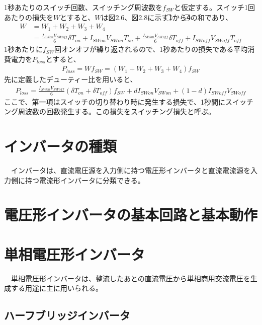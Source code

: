 \documentclass{article}
\begin{document}
1秒あたりのスイッチ回数、スイッチング周波数を\(f_{SW}\)と仮定する。スイッチ1回あたりの損失を\(W\)とすると、\(W\)は図2.6、図2.8に示す\textcircled{\scriptsize 1}から\textcircled{\scriptsize 4}の和であり、
\begin{align}
    W &= W_1 + W_2 + W_3 + W_4 \\
      &= \frac{I_{SWon}V_{SWoff}}{6}\delta T_{on} + I_{SWon}V_{SWon}T_{on} + \frac{I_{SWon}V_{SWoff}}{6}\delta T_{off} + I_{SWoff}V_{SWoff}T_{off}
\end{align}
1秒あたりに\(f_{SW}\)回オンオフが繰り返されるので、1秒あたりの損失である平均消費電力を\(P_{loss}\)とすると、
\begin{align}
    P_{loss} = Wf_{SW}=(W_1 + W_2 + W_3 + W_4)f_{SW}
\end{align}
先に定義したデューティー比を用いると、
\begin{align}
    P_{loss} = \frac{I_{SWon}V_{SWoff}}{6}(\delta T_{on} + \delta T_{off})f_{SW} + dI_{SWon}V_{SWon} + (1-d)I_{SWoff}V_{SWoff}
\end{align}
ここで、第一項はスイッチの切り替わり時に発生する損失で、1秒間にスイッチング周波数の回数発生する。この損失をスイッチング損失と呼ぶ。

\setcounter{section}{0}
\renewcommand{\thesection}{4.\arabic{section}}

\section{インバータの種類}
　インバータは、直流電圧源を入力側に持つ電圧形インバータと直流電流源を入力側に持つ電流形インバータに分類できる。

\section{電圧形インバータの基本回路と基本動作}

\section{単相電圧形インバータ}
　単相電圧形インバータは、整流したあとの直流電圧から単相商用交流電圧を生成する用途に主に用いられる。
\subsection{ハーフブリッジインバータ}
\end{document}
